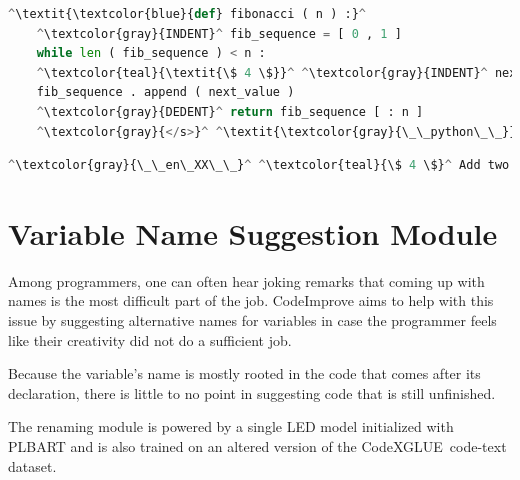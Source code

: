             \medskip
    
            \begin{minipage}{.45\textwidth}
                \begin{lstlisting}[language=Python, caption={Another example of code in listing \ref{lst:comment} formatted as an input for comment generation to predict the comment on line 4. Italics denote global attention.}]
    ^\textit{\textcolor{blue}{def} fibonacci ( n ) :}^ 
    ^\textcolor{gray}{INDENT}^ fib_sequence = [ 0 , 1 ]
    while len ( fib_sequence ) < n :
    ^\textcolor{teal}{\textit{\$ 4 \$}}^ ^\textcolor{gray}{INDENT}^ next_value = fib_sequence [ - 1 ] + fib_sequence [ - 2 ]
    fib_sequence . append ( next_value )
    ^\textcolor{gray}{DEDENT}^ return fib_sequence [ : n ]
    ^\textcolor{gray}{</s>}^ ^\textit{\textcolor{gray}{\_\_python\_\_}}^
                \end{lstlisting}
            \end{minipage}
            \hfill
            \begin{minipage}{.45\textwidth}
                \begin{lstlisting}[language=Python, caption={Code in listing \ref{lst:comment} formatted as a label.}]
    ^\textcolor{gray}{\_\_en\_XX\_\_}^ ^\textcolor{teal}{\$ 4 \$}^ Add two last numbers from the sequence together ^\textcolor{gray}{</s>}^
                \end{lstlisting}
            \end{minipage}
    
    \section{Variable Name Suggestion Module}
        Among programmers, one can often hear joking remarks that coming up with names is the most difficult part of the job. CodeImprove aims to help with this issue by suggesting alternative names for variables in case the programmer feels like their creativity did not do a sufficient job.
        
        Because the variable's name is mostly rooted in the code that comes after its declaration, there is little to no point in suggesting code that is still unfinished.
        
        \medskip
        
        The renaming module is powered by a single LED model initialized with PLBART and is also trained on an altered version of the CodeXGLUE\,\cite{codexglue} code-text dataset. 
        
